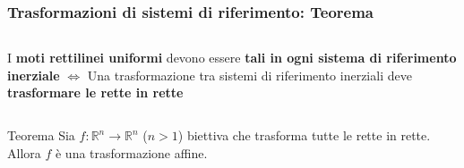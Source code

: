 \documentclass{beamer}
\begin{document}
\begin{frame}
    \frametitle{Trasformazioni di sistemi di riferimento: Teorema}
    \begin{columns}
    I \textbf{moti rettilinei uniformi} devono essere \textbf{tali in ogni sistema di riferimento inerziale}
    $\Longleftrightarrow$
    Una trasformazione tra sistemi di riferimento inerziali deve \textbf{trasformare le rette in rette}

    \end{columns}  \vspace{10mm}  
    \begin{block}{Teorema}
        Sia $f:\mathbb{R}^n\longrightarrow\mathbb{R}^n $ ($n>1$) biettiva che trasforma tutte le rette in rette. Allora $f$ è una trasformazione affine.
    \end{block}
\end{frame}
\end{document}
